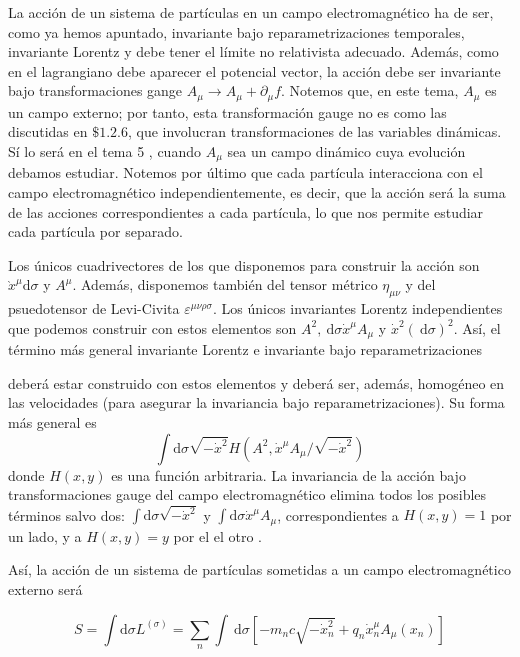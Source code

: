 La acción de un sistema de partículas en un campo electromagnético ha de ser, como ya hemos apuntado, invariante bajo reparametrizaciones temporales, invariante Lorentz y debe tener el límite no relativista adecuado. Además, como en el lagrangiano debe aparecer el potencial vector, la acción debe ser invariante bajo transformaciones gange $A_{\mu} \rightarrow A_{\mu}+\partial_{\mu} f$. Notemos que, en este tema, $A_{\mu}$ es un campo externo; por tanto, esta transformación gauge no es como las discutidas en $\$ 1.2 .6$, que involucran transformaciones de las variables dinámicas. Sí lo será en el tema 5 , cuando $A_{\mu}$ sea un campo dinámico cuya evolución debamos estudiar. Notemos por último que cada partícula interacciona con el campo electromagnético independientemente, es decir, que la acción será la suma de las acciones correspondientes a cada partícula, lo que nos permite estudiar cada partícula por separado.

Los únicos cuadrivectores de los que disponemos para construir la acción son $\grave{x}^{\mu} \mathrm{d} \sigma$ y $A^{\mu}$. Además, disponemos también del tensor métrico $\eta_{\mu \nu}$ y del psuedotensor de Levi-Civita $\varepsilon^{\mu \nu \rho \sigma}$. Los únicos invariantes Lorentz independientes que podemos construir con estos elementos son $A^{2}, \mathrm{~d} \sigma \dot{x}^{\mu} A_{\mu}$ y $\dot{x}^{2}(\mathrm{~d} \sigma)^{2}$. Así, el término más general invariante Lorentz e invariante bajo reparametrizaciones

deberá estar construido con estos elementos y deberá ser, además, homogéneo en las velocidades (para asegurar la invariancia bajo reparametrizaciones). Su forma más general es 
$$
\int \mathrm{d} \sigma \sqrt{-\dot{x}^{2}} H\left(A^{2}, \dot{x}^{\mu} A_{\mu} / \sqrt{-\dot{x}^{2}}\right)
$$
donde $H(x, y)$ es una función arbitraria. La invariancia de la acción bajo transformaciones gauge del campo electromagnético elimina todos los posibles términos salvo dos: $\int \mathrm{d} \sigma \sqrt{-\dot{x}^{2}}$ y $\int \mathrm{d} \sigma \dot{x}^{\mu} A_{\mu}$, correspondientes a $H(x, y)=1$ por un lado, y a $H(x, y)=y$ por el el otro .

Así, la acción de un sistema de partículas sometidas a un campo electromagnético externo será

\begin{equation}
S=\int \mathrm{d} \sigma L^{(\sigma)}=\sum_{n} \int \mathrm{~d} \sigma\left[-m_{n} c \sqrt{-\dot{x}_{n}^{2}}+q_{n} \dot{x}_{n}^{\mu} A_{\mu}\left(x_{n}\right)\right] 
\end{equation}

